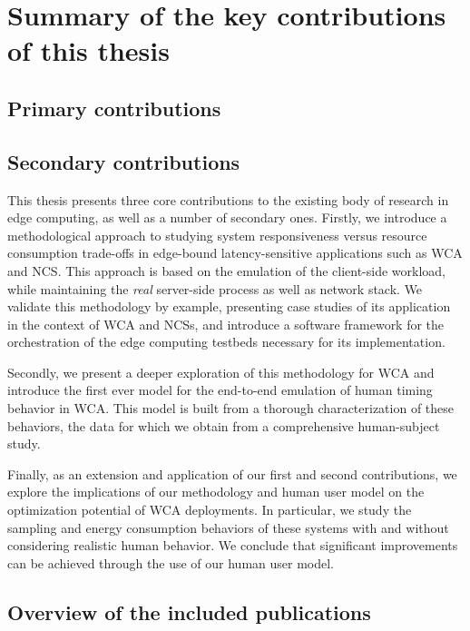 \section{Summary of the key contributions of this thesis}\label{sec:summary_contributions}

\subsection{Primary contributions}

\subsection{Secondary contributions}


This thesis presents three core contributions to the existing body of research in edge computing, as well as a number of secondary ones.
Firstly, we introduce a methodological approach to studying system responsiveness versus resource consumption trade-offs in edge-bound latency-sensitive applications such as \gls{WCA} and \gls{NCS}.
This approach is based on the emulation of the client-side workload, while maintaining the \emph{real} server-side process as well as network stack.
We validate this methodology by example, presenting case studies of its application in the context of \gls{WCA} and \glspl{NCS}, and introduce a software framework for the orchestration of the edge computing testbeds necessary for its implementation.

Secondly, we present a deeper exploration of this methodology for \gls{WCA} and introduce the first ever model for the end-to-end emulation of human timing behavior in \gls{WCA}.
This model is built from a thorough characterization of these behaviors, the data for which we obtain from a comprehensive human-subject study.

Finally, as an extension and application of our first and second contributions, we explore the implications of our methodology and human user model on the optimization potential of \gls{WCA} deployments.
In particular, we study the sampling and energy consumption behaviors of these systems with and without considering realistic human behavior.
We conclude that significant improvements can be achieved through the use of our human user model.

\subsection{Overview of the included publications}

